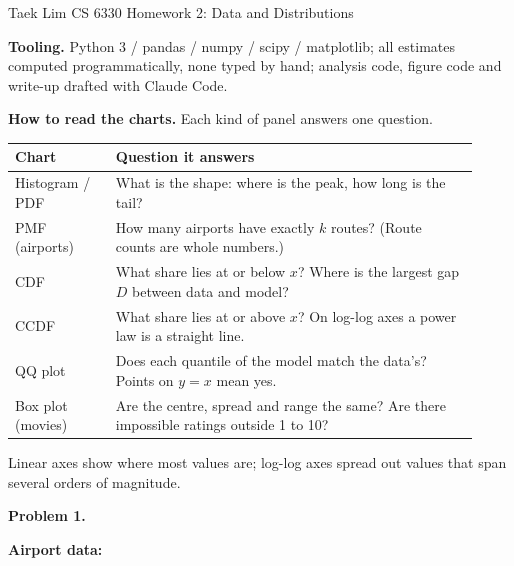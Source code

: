 \documentclass[11pt]{article}
\newcommand{\prompt}[1]{\textcolor{prompt}{#1}}
\begin{document}
\hfill Taek Lim \quad CS 6330 Homework 2: Data and Distributions

\bigskip
\textbf{Tooling.} Python 3 / pandas / numpy / scipy / matplotlib; all estimates computed
programmatically, none typed by hand; analysis code, figure code and write-up drafted
with Claude Code.

\medskip
\textbf{How to read the charts.} Each kind of panel answers one question.
\begin{center}
\small
\begin{tabular}{p{0.2\linewidth}p{0.72\linewidth}}
  \toprule
  Chart & Question it answers \\
  \midrule
  Histogram / PDF & What is the shape: where is the peak, how long is the tail? \\
  \midrule
  PMF (airports) & How many airports have exactly $k$ routes? (Route counts are whole numbers.) \\
  \midrule
  CDF & What share lies at or below $x$? Where is the largest gap $D$ between data and model? \\
  \midrule
  CCDF & What share lies at or above $x$? On log-log axes a power law is a straight line. \\
  \midrule
  QQ plot & Does each quantile of the model match the data's? Points on $y = x$ mean yes. \\
  \midrule
  Box plot (movies) & Are the centre, spread and range the same? Are there impossible ratings
    outside 1 to 10? \\
  \bottomrule
\end{tabular}
\end{center}
Linear axes show where most values are; log-log axes spread out values that span several
orders of magnitude.

\bigskip
\prompt{\textbf{Problem 1.}}

\medskip
\prompt{\textbf{Airport data:}}
\end{document}
